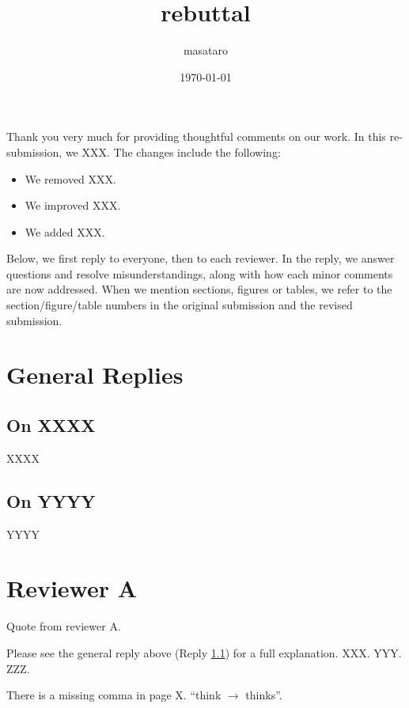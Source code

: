 \documentclass[11pt]{article}
\author{masataro}
\date{\today}
\title{rebuttal}
\newcounter{reviewer} %
\newcounter{review}[section]
\newcounter{reply}[section]
\newcommand{\refrep}[1]{Reply \ref{#1}}
\begin{document}
Thank you very much for providing thoughtful comments on our work.
In this re-submission, we XXX.
The changes include the following:
\begin{itemize}
 \item We removed XXX.
 \item We improved XXX.
 \item We added XXX.
\end{itemize}

Below, we first reply to everyone, then to each reviewer.
In the reply, we answer questions and resolve misunderstandings,
along with how each minor comments are now addressed.
When we mention sections, figures or tables, we refer to the section/figure/table numbers in the original submission and the revised submission.

\section{General Replies}

\subsection{On XXXX}
\label{sec:XXXX}

XXXX

\subsection{On YYYY}
\label{sec:YYYY}

YYYY

\section{Reviewer A}
\label{sec:A}

\begin{review}
\label{rev:A1}
Quote from reviewer A.
\end{review}

\begin{reply}
\label{rep:A1}
Please see the general reply above (\refrep{sec:XXXX}) for a full explanation.
XXX. YYY. ZZZ.
\end{reply}


\begin{review}
There is a missing comma in page X. ``think $\rightarrow$ thinks''.
\end{review}

\end{document}
